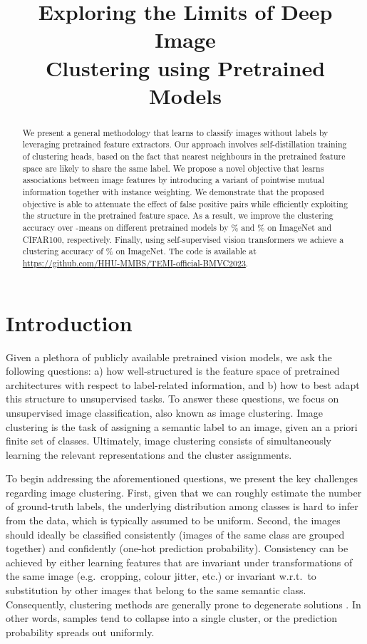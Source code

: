 \documentclass{bmvc2k}
\title{ \hspace{0.25cm}  Exploring the Limits of Deep Image \\ \hspace{0.25cm}  Clustering using Pretrained Models}
\begin{document}
\maketitle



\begin{abstract}
We present a general methodology that learns to classify images without labels by leveraging pretrained feature extractors. Our approach involves self-distillation training of clustering heads, based on the fact that nearest neighbours in the pretrained feature space are likely to share the same label. We propose a novel objective that learns associations between image features by introducing a variant of pointwise mutual information together with instance weighting. We demonstrate that the proposed objective is able to attenuate the effect of false positive pairs while efficiently exploiting the structure in the pretrained feature space. As a result, we improve the clustering accuracy over -means on  different pretrained models by \% and \% on ImageNet and CIFAR100, respectively. Finally, using self-supervised vision transformers we achieve a clustering accuracy of \% on ImageNet. The code is available at \url{https://github.com/HHU-MMBS/TEMI-official-BMVC2023}.
\end{abstract}

\section{Introduction}
\label{intro}
Given a plethora of publicly available pretrained vision models, we ask the following questions: a) how well-structured is the feature space of pretrained architectures with respect to label-related information, and b) how to best adapt this structure to unsupervised tasks. To answer these questions, we focus on unsupervised image classification, also known as image clustering. Image clustering is the task of assigning a semantic label to an image, given an a priori finite set of classes. Ultimately, image clustering consists of simultaneously learning the relevant representations and the cluster assignments. 



To begin addressing the aforementioned questions, we present the key challenges regarding image clustering. First, given that we can roughly estimate the number of ground-truth labels, the underlying distribution among classes is hard to infer from the data, which is typically assumed to be uniform. Second, the images should ideally be classified consistently (images of the same class are grouped together) and confidently (one-hot prediction probability).
\newpage
Consistency can be achieved by either learning features that are invariant under transformations of the same image (e.g.\ cropping, colour jitter, etc.) or invariant w.r.t.\ to substitution by other images that belong to the same semantic class.
Consequently, clustering methods are generally prone to degenerate solutions \cite{sscn}. In other words, samples tend to collapse into a single cluster, or the prediction probability spreads out uniformly.
\end{document}
